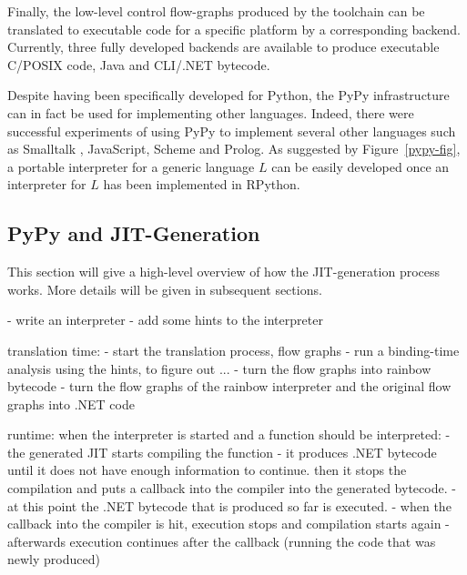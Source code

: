 Finally, the low-level control flow-graphs produced by the toolchain
can be translated to executable code for a specific platform by a
corresponding backend.
Currently, three fully developed backends are available to produce
executable C/POSIX code, Java and CLI/.NET bytecode. 

Despite having been specifically developed for Python, the PyPy infrastructure
can in fact be used for implementing other languages. Indeed, there were
successful experiments of using PyPy to implement several other languages such
as Smalltalk \cite{BolzEtAl08}, JavaScript, Scheme and Prolog.
As suggested by Figure~\ref{pypy-fig}, a portable interpreter for a
generic language $L$  can be
easily developed once an interpreter for $L$ has been implemented in
RPython.

\subsection{PyPy and JIT-Generation}

This section will give a high-level overview of how the JIT-generation process
works. More details will be given in subsequent sections.

- write an interpreter
- add some hints to the interpreter

translation time:
- start the translation process, flow graphs
- run a binding-time analysis using the hints, to figure out ...
- turn the flow graphs into rainbow bytecode
- turn the flow graphs of the rainbow interpreter and the original flow graphs
into .NET code

runtime:
when the interpreter is started and a function should be interpreted:
 - the generated JIT starts compiling the function 
 - it produces .NET bytecode until it does not have enough information to
 continue. then it stops the compilation and puts a callback into the compiler
 into the generated bytecode.
 - at this point the .NET bytecode that is produced so far is executed.
 - when the callback into the compiler is hit, execution stops and compilation
 starts again
 - afterwards execution continues after the callback (running the code that was
 newly produced)


